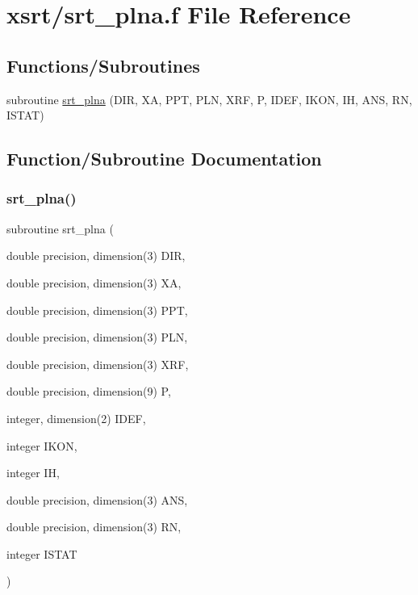 \hypertarget{srt__plna_8f}{}\section{xsrt/srt\+\_\+plna.f File Reference}
\label{srt__plna_8f}
\subsection*{Functions/\+Subroutines}
\begin{DoxyCompactItemize}
\item 
subroutine \hyperlink{srt__plna_8f_ab3c7a1b088bd310cf2142ab97fd83601}{srt\+\_\+plna} (D\+IR, XA, P\+PT, P\+LN, X\+RF, P, I\+D\+EF, I\+K\+ON, IH, A\+NS, RN, I\+S\+T\+AT)
\end{DoxyCompactItemize}


\subsection{Function/\+Subroutine Documentation}
\mbox{\label{srt__plna_8f_ab3c7a1b088bd310cf2142ab97fd83601}} 
\subsubsection{\texorpdfstring{srt\+\_\+plna()}{srt\_plna()}}
{\footnotesize\ttfamily subroutine srt\+\_\+plna (\begin{DoxyParamCaption}\item[{double precision, dimension(3)}]{D\+IR,  }\item[{double precision, dimension(3)}]{XA,  }\item[{double precision, dimension(3)}]{P\+PT,  }\item[{double precision, dimension(3)}]{P\+LN,  }\item[{double precision, dimension(3)}]{X\+RF,  }\item[{double precision, dimension(9)}]{P,  }\item[{integer, dimension(2)}]{I\+D\+EF,  }\item[{integer}]{I\+K\+ON,  }\item[{integer}]{IH,  }\item[{double precision, dimension(3)}]{A\+NS,  }\item[{double precision, dimension(3)}]{RN,  }\item[{integer}]{I\+S\+T\+AT }\end{DoxyParamCaption})}

